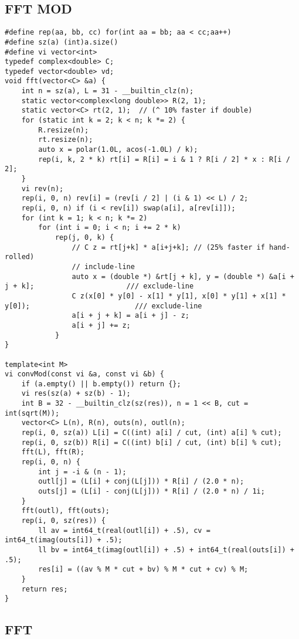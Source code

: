 \subsection{FFT MOD}

\begin{lstlisting}[style=cpp]
#define rep(aa, bb, cc) for(int aa = bb; aa < cc;aa++)
#define sz(a) (int)a.size()
#define vi vector<int>
typedef complex<double> C;
typedef vector<double> vd;
void fft(vector<C> &a) {
    int n = sz(a), L = 31 - __builtin_clz(n);
    static vector<complex<long double>> R(2, 1);
    static vector<C> rt(2, 1);  // (^ 10% faster if double)
    for (static int k = 2; k < n; k *= 2) {
        R.resize(n);
        rt.resize(n);
        auto x = polar(1.0L, acos(-1.0L) / k);
        rep(i, k, 2 * k) rt[i] = R[i] = i & 1 ? R[i / 2] * x : R[i / 2];
    }
    vi rev(n);
    rep(i, 0, n) rev[i] = (rev[i / 2] | (i & 1) << L) / 2;
    rep(i, 0, n) if (i < rev[i]) swap(a[i], a[rev[i]]);
    for (int k = 1; k < n; k *= 2)
        for (int i = 0; i < n; i += 2 * k)
            rep(j, 0, k) {
                // C z = rt[j+k] * a[i+j+k]; // (25% faster if hand-rolled)  
                // include-line
                auto x = (double *) &rt[j + k], y = (double *) &a[i + j + k];                      /// exclude-line
                C z(x[0] * y[0] - x[1] * y[1], x[0] * y[1] + x[1] * y[0]);                         /// exclude-line
                a[i + j + k] = a[i + j] - z;
                a[i + j] += z;
            }
}

template<int M>
vi convMod(const vi &a, const vi &b) {
    if (a.empty() || b.empty()) return {};
    vi res(sz(a) + sz(b) - 1);
    int B = 32 - __builtin_clz(sz(res)), n = 1 << B, cut = int(sqrt(M));
    vector<C> L(n), R(n), outs(n), outl(n);
    rep(i, 0, sz(a)) L[i] = C((int) a[i] / cut, (int) a[i] % cut);
    rep(i, 0, sz(b)) R[i] = C((int) b[i] / cut, (int) b[i] % cut);
    fft(L), fft(R);
    rep(i, 0, n) {
        int j = -i & (n - 1);
        outl[j] = (L[i] + conj(L[j])) * R[i] / (2.0 * n);
        outs[j] = (L[i] - conj(L[j])) * R[i] / (2.0 * n) / 1i;
    }
    fft(outl), fft(outs);
    rep(i, 0, sz(res)) {
        ll av = int64_t(real(outl[i]) + .5), cv = int64_t(imag(outs[i]) + .5);
        ll bv = int64_t(imag(outl[i]) + .5) + int64_t(real(outs[i]) + .5);
        res[i] = ((av % M * cut + bv) % M * cut + cv) % M;
    }
    return res;
}
\end{lstlisting}

\subsection{FFT}


